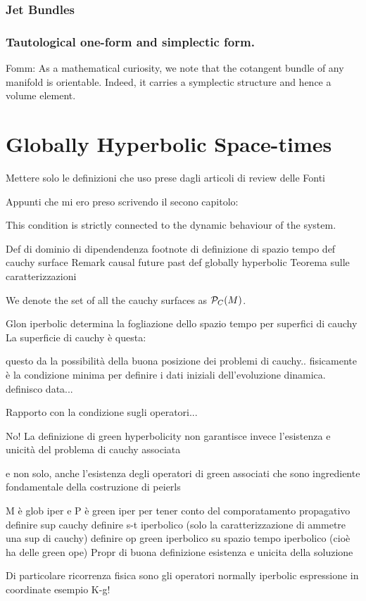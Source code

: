 \documentclass[Main]{subfiles}
\begin{document}
			\subsubsection{Jet Bundles}
			\subsubsection{Tautological one-form and simplectic form.}
				Fomm: As a mathematical curiosity, we note that the cotangent bundle of any
manifold is orientable. Indeed, it carries a symplectic structure and hence a volume element.
	\section{Globally Hyperbolic Space-times}
			\begin{Warning}
				Mettere solo le definizioni che uso prese dagli articoli di review delle Fonti
			\end{Warning}	
			Appunti che mi ero preso scrivendo il secono capitolo:
					
			This condition is strictly connected to the dynamic behaviour of the system.
			
			\begin{Warning}
			Def di dominio di dipendendenza
			footnote di definizione di spazio tempo
			def cauchy surface
			Remark causal future past
			def globally hyperbolic
			Teorema sulle caratterizzazioni
			\end{Warning}			
			
			\begin{notationfix}
				We denote the set of all the cauchy surfaces as $\mathcal{P}_{C}(M)$.
			\end{notationfix}
					

		Glon iperbolic determina la fogliazione dello spazio tempo per superfici di cauchy
		La superficie di cauchy è questa:
		\begin{definition}
		\end{definition}		
		questo da la possibilità della buona posizione dei problemi di cauchy.. fisicamente è la condizione minima per definire i dati iniziali dell'evoluzione dinamica.
		definisco data...
						
		\begin{Warning}
		Rapporto con la condizione sugli operatori...		
		
				
	No!		La definizione di green hyperbolicity non garantisce invece l'esistenza e unicità del problema di cauchy associata
		
		e non solo, anche l'esistenza degli operatori di green associati che sono ingrediente fondamentale della costruzione di peierls

		M è glob iper e P è green iper per tener conto del comporatamento propagativo
		definire sup cauchy
		definire s-t iperbolico (solo la caratterizzazione di ammetre una sup di cauchy)
		definire op green iperbolico su spazio tempo iperbolico (cioè ha delle green ope)
		Propr di buona definizione esistenza e unicita della soluzione
		
		Di particolare ricorrenza fisica sono gli operatori normally iperbolic
		espressione in coordinate
		esempio K-g!
		\end{Warning}						
		
\end{document}
